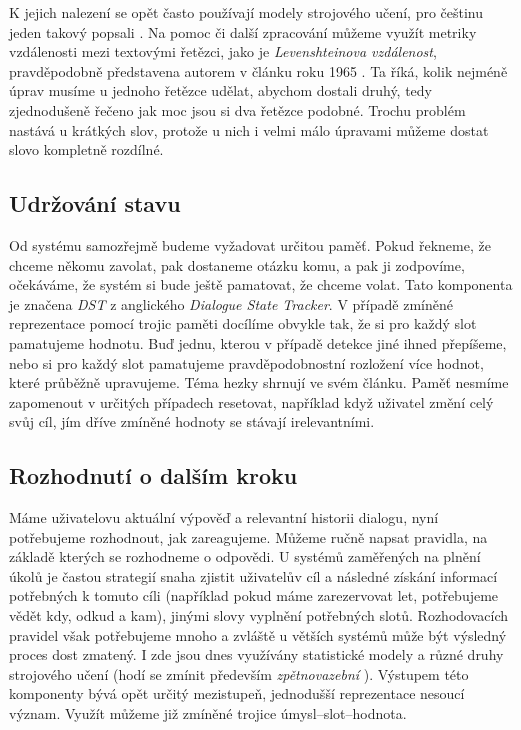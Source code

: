 K jejich nalezení se opět často používají modely strojového učení, pro češtinu
jeden takový popsali \citet{ekstein_czech_2019}. Na pomoc či další zpracování
můžeme využít metriky vzdálenosti mezi textovými řetězci,
jako je \textit{Levenshteinova vzdálenost}, pravděpodobně představena autorem v
článku roku 1965 \citep{Levenshtein1965BinaryCC}. Ta říká, kolik nejméně úprav
musíme u jednoho řetězce udělat, abychom dostali druhý, tedy zjednodušeně řečeno
jak moc jsou si dva řetězce podobné. Trochu problém nastává u krátkých slov,
protože u nich i velmi málo úpravami můžeme dostat slovo kompletně rozdílné.

\subsection{Udržování stavu}\label{dst}

Od systému samozřejmě budeme vyžadovat určitou paměť. Pokud řekneme, že
chceme někomu zavolat, pak dostaneme otázku komu, a pak ji zodpovíme, očekáváme,
že systém si bude ještě pamatovat, že chceme volat. Tato komponenta je
značena \textit{DST} z anglického \textit{Dialogue State Tracker}. V případě
zmíněné reprezentace pomocí trojic paměti docílíme obvykle tak, že si pro každý
slot pamatujeme hodnotu. Buď jednu, kterou v případě detekce jiné ihned přepíšeme,
nebo si pro každý slot pamatujeme pravděpodobnostní rozložení více hodnot, které
průběžně upravujeme. Téma hezky shrnují \citet{williams_dialog_2016} ve svém článku.
Paměť nesmíme zapomenout v určitých případech
resetovat, například když uživatel změní celý svůj cíl, jím dříve
zmíněné hodnoty se stávají irelevantními.

\subsection{Rozhodnutí o dalším kroku}\label{dp}

Máme uživatelovu aktuální výpověď a relevantní historii dialogu, nyní potřebujeme
rozhodnout, jak zareagujeme. Můžeme ručně napsat pravidla, na základě kterých
se rozhodneme o odpovědi. U systémů zaměřených na plnění úkolů je častou
strategií snaha zjistit uživatelův cíl a následné získání informací potřebných
k tomuto cíli (například pokud máme zarezervovat let, potřebujeme vědět kdy,
odkud a kam), jinými slovy vyplnění potřebných slotů. Rozhodovacích pravidel
však potřebujeme mnoho a zvláště u větších systémů může být výsledný proces dost
zmatený. I zde jsou dnes využívány statistické modely a různé druhy strojového
učení (hodí se zmínit především \textit{zpětnovazební} \citep{su_reward_2015}). Výstupem této komponenty
bývá opět určitý mezistupeň, jednodušší reprezentace nesoucí význam. Využít
můžeme již zmíněné trojice úmysl--slot--hodnota.

